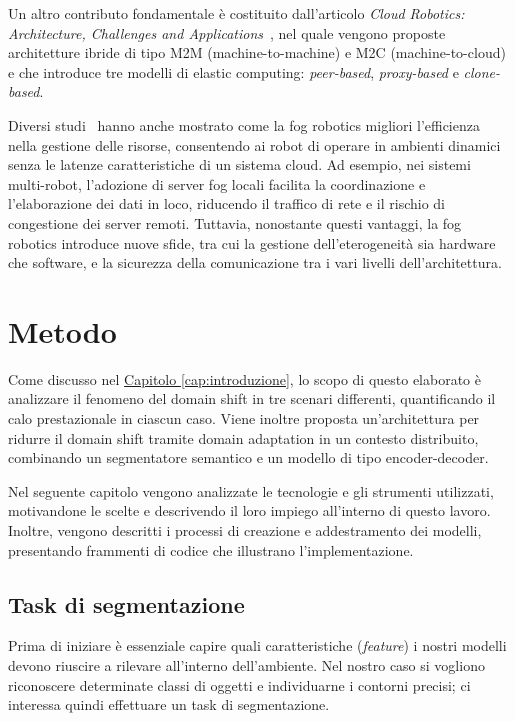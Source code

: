 \documentclass[12pt]{report}
\begin{document}
Un altro contributo fondamentale è costituito dall'articolo \textit{Cloud Robotics: Architecture, Challenges and Applications}~\cite{6201212}, nel quale vengono proposte architetture ibride di tipo M2M (machine-to-machine) e M2C (machine-to-cloud) e che introduce tre modelli di elastic computing: \textit{peer-based}, \textit{proxy-based} e \textit{clone-based}.

Diversi studi~\cite{9360855} hanno anche mostrato come la fog robotics migliori l'efficienza nella gestione delle risorse, consentendo ai robot di operare in ambienti dinamici senza le latenze caratteristiche di un sistema cloud. Ad esempio, nei sistemi multi-robot, l'adozione di server fog locali facilita la coordinazione e l'elaborazione dei dati in loco, riducendo il traffico di rete e il rischio di congestione dei server remoti. Tuttavia, nonostante questi vantaggi, la fog robotics introduce nuove sfide, tra cui la gestione dell'eterogeneità sia hardware che software, e la sicurezza della comunicazione tra i vari livelli dell'architettura.

\chapter{Metodo}
\label{chap:metodo}

Come discusso nel \hyperref[cap:introduzione]{Capitolo \ref{cap:introduzione}}, lo scopo di questo elaborato è analizzare il fenomeno del domain shift in tre scenari differenti, quantificando il calo prestazionale in ciascun caso. Viene inoltre proposta un'architettura per ridurre il domain shift tramite domain adaptation in un contesto distribuito, combinando un segmentatore semantico e un modello di tipo encoder-decoder.

Nel seguente capitolo vengono analizzate le tecnologie e gli strumenti utilizzati, motivandone le scelte e descrivendo il loro impiego all'interno di questo lavoro. Inoltre, vengono descritti i processi di creazione e addestramento dei modelli, presentando frammenti di codice che illustrano l'implementazione.

\section{Task di segmentazione}
\label{sec:task_di_segmentazione}

Prima di iniziare è essenziale capire quali caratteristiche (\textit{feature}) i nostri modelli devono riuscire a rilevare all'interno dell'ambiente. Nel nostro caso si vogliono riconoscere determinate classi di oggetti e individuarne i contorni precisi; ci interessa quindi effettuare un task di segmentazione.
\end{document}

